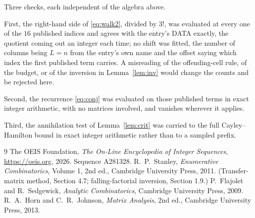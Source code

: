 \documentclass[11pt,a4paper]{article}
\theoremstyle{plain}
\theoremstyle{definition}
\begin{document}
Three checks, each independent of the algebra above.

First, the right-hand side of \eqref{eq:walk2}, divided by $3!$, was evaluated at every
one of the $16$ published indices and agrees with the entry's DATA exactly, the quotient
coming out an integer each time; no shift was fitted, the number of columns being
$L=n$ from the entry's own name and the offset saying which index the first published
term carries. A misreading of the offending-cell rule, of the budget, or of the inversion in
Lemma~\ref{lem:inv} would change the counts and be rejected here.

Second, the recurrence \eqref{eq:conj} was evaluated on those published terms in exact
integer arithmetic, with no matrices involved, and vanishes wherever it applies.

Third, the annihilation test of Lemma~\ref{lem:crit} was carried to the full
Cayley--Hamilton bound in exact integer arithmetic rather than to a sampled prefix.

\begin{thebibliography}{9}
 The OEIS Foundation, \emph{The On-Line Encyclopedia of Integer
Sequences}, \url{https://oeis.org}, 2026. Sequence A281328.
 R.~P.~Stanley, \emph{Enumerative Combinatorics}, Volume 1, 2nd ed.,
Cambridge University Press, 2011. (Transfer-matrix method, Section 4.7; falling-factorial
inversion, Section 1.9.)
 P.~Flajolet and R.~Sedgewick, \emph{Analytic Combinatorics}, Cambridge
University Press, 2009.
 R.~A.~Horn and C.~R.~Johnson, \emph{Matrix Analysis}, 2nd ed., Cambridge
University Press, 2013.
\end{thebibliography}
\end{document}
